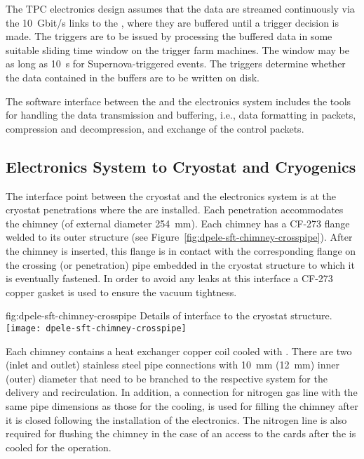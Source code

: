 The TPC electronics design assumes that the data are streamed continuously via the \SI{10}{Gbit/s} links to the , where they are buffered until a trigger decision %
is made. The triggers are to be issued by processing the buffered data in some suitable sliding time window on the trigger farm machines. 
The window may be as long as \SI{10}{s} for Supernova-triggered events.
The triggers determine whether the data contained in the buffers are to be written on disk. 

The software interface between the  and the electronics system
includes the tools for handling the data transmission and buffering, i.e.,  data formatting in  packets, compression and decompression, and exchange of the control packets.

\subsection{Electronics System to Cryostat and Cryogenics}
\label{sec:fddp-tpc-elec-intfc-cryo}

The interface point between the cryostat and the \dual electronics system is at the cryostat penetrations where the  are %
installed. Each penetration %
accommodates the chimney (of external diameter \SI{254}{\mm}). Each chimney has a CF-273 flange welded to its outer structure (see Figure~\ref{fig:dpele-sft-chimney-crosspipe}). After the chimney is inserted, this flange is in contact with the corresponding flange on the crossing (or penetration) pipe embedded in the cryostat structure to which it is eventually fastened. In order to avoid any leaks at this interface a CF-273 copper gasket is used to ensure the vacuum tightness.  

\begin{dunefigure}{fig:dpele-sft-chimney-crosspipe}
{Details of  interface to the cryostat structure.}
\texttt{[image: dpele-sft-chimney-crosspipe]}
\end{dunefigure}

Each chimney contains a heat exchanger copper coil cooled with \lar. There are two (inlet and outlet) stainless steel pipe connections with \SI{10}{\mm} (\SI{12}{\mm}) inner (outer) diameter that need to be branched to the respective system for the \lar delivery and recirculation. In addition, %
a connection for nitrogen gas line with the same pipe dimensions as those for the \lar cooling, %
is used for filling the chimney after it is closed following the installation of the  electronics. The nitrogen line is also required for flushing the chimney in the case of an access to the  cards after the  is cooled for the operation. 

